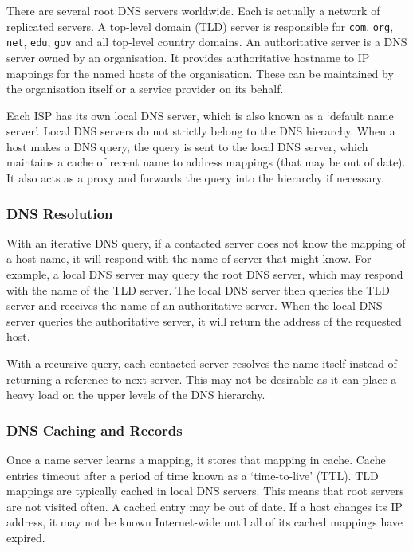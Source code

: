 There are several root DNS servers worldwide.
Each is actually a network of replicated servers.
A top-level domain (TLD) server is responsible for \texttt{com}, \texttt{org}, \texttt{net}, \texttt{edu}, \texttt{gov} and all top-level country domains.
An authoritative server is a DNS server owned by an organisation.
It provides authoritative hostname to IP mappings for the named hosts of the organisation.
These can be maintained by the organisation itself or a service provider on its behalf.

Each ISP has its own local DNS server, which is also known as a `default name server'.
Local DNS servers do not strictly belong to the DNS hierarchy.
When a host makes a DNS query, the query is sent to the local DNS server, which maintains a cache of recent name to address mappings (that may be out of date).
It also acts as a proxy and forwards the query into the hierarchy if necessary.

\subsubsection{DNS Resolution}

With an iterative DNS query, if a contacted server does not know the mapping of a host name, it will respond with the name of server that might know.
For example, a local DNS server may query the root DNS server, which may respond with the name of the TLD server.
The local DNS server then queries the TLD server and receives the name of an authoritative server.
When the local DNS server queries the authoritative server, it will return the address of the requested host.

With a recursive query, each contacted server resolves the name itself instead of returning a reference to next server.
This may not be desirable as it can place a heavy load on the upper levels of the DNS hierarchy.

\subsubsection{DNS Caching and Records}

Once a name server learns a mapping, it stores that mapping in cache.
Cache entries timeout after a period of time known as a `time-to-live' (TTL).
TLD mappings are typically cached in local DNS servers.
This means that root servers are not visited often.
A cached entry may be out of date.
If a host changes its IP address, it may not be known Internet-wide until all of its cached mappings have expired.


